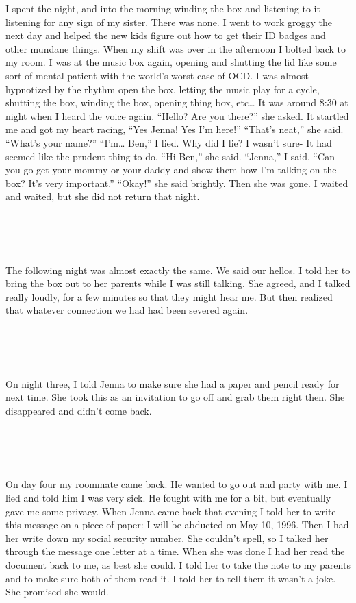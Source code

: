 \documentclass[a4paper]{article}
\begin{document}
I spent the night, and into the morning winding the box and listening to it- listening for any sign of my sister. There was none. I went to work groggy the next day and helped the new kids figure out how to get their ID badges and other mundane things.
When my shift was over in the afternoon I bolted back to my room. I was at the music box again, opening and shutting the lid like some sort of mental patient with the world’s worst case of OCD.
I was almost hypnotized by the rhythm open the box, letting the music play for a cycle, shutting the box, winding the box, opening thing box, etc… It was around 8:30 at night when I heard the voice again.
“Hello? Are you there?” she asked.
It startled me and got my heart racing, “Yes Jenna! Yes I’m here!”
“That’s neat,” she said. “What’s your name?”
“I’m… Ben,” I lied. Why did I lie? I wasn’t sure- It had seemed like the prudent thing to do.
“Hi Ben,” she said.
“Jenna,” I said, “Can you go get your mommy or your daddy and show them how I’m talking on the box? It’s very important.”
“Okay!” she said brightly. Then she was gone.
I waited and waited, but she did not return that night. \\ \\

\hrule ~ \\ \\

The following night was almost exactly the same. We said our hellos. I told her to bring the box out to her parents while I was still talking.
She agreed, and I talked really loudly, for a few minutes so that they might hear me. But then realized that whatever connection we had had been severed again. \\ \\

\hrule ~ \\ \\

On night three, I told Jenna to make sure she had a paper and pencil ready for next time.
She took this as an invitation to go off and grab them right then. She disappeared and didn’t come back. \\ \\

\hrule ~ \\ \\

On day four my roommate came back. He wanted to go out and party with me. I lied and told him I was very sick. He fought with me for a bit, but eventually gave me some privacy.
When Jenna came back that evening I told her to write this message on a piece of paper: I will be abducted on May 10, 1996. Then I had her write down my social security number. She couldn’t spell, so I talked her through the message one letter at a time.
When she was done I had her read the document back to me, as best she could. I told her to take the note to my parents and to make sure both of them read it. I told her to tell them it wasn’t a joke. She promised she would. \\ \\
\end{document}
